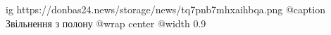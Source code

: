 
 
 
 
 

\ifcmt
  ig https://donbas24.news/storage/news/tq7pnb7mhxaihbqa.png
	@caption Звільнення з полону
  @wrap center
  @width 0.9
\fi
